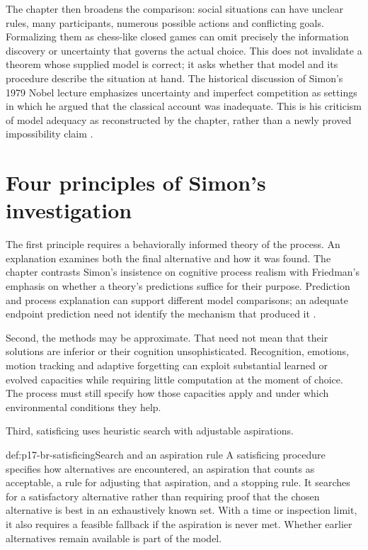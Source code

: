 The chapter then broadens the comparison: social situations can have
unclear rules, many participants, numerous possible actions and conflicting
goals. Formalizing them as chess-like closed games can omit precisely
the information discovery or uncertainty that governs the actual choice.
This does not invalidate a theorem whose supplied model is correct; it
asks whether that model and its procedure describe the situation at hand.
The historical discussion of Simon's 1979 Nobel lecture emphasizes
uncertainty and imperfect competition as settings in which he argued
that the classical account was inadequate. This is his criticism of
model adequacy as reconstructed by the chapter, rather than a newly
proved impossibility claim \cite[note~4, p.~513]{HertwigKozyreva2021Bounded}.

\section{Four principles of Simon's investigation}
\label{sec:p17-br-four-principles}

The first principle requires a behaviorally informed theory of the process.
An explanation examines both the final alternative and how it was found.
The chapter contrasts Simon's insistence on cognitive process realism
with Friedman's emphasis on whether a theory's predictions suffice for
their purpose. Prediction and process explanation can support different
model comparisons; an adequate endpoint prediction need not identify the
mechanism that produced it \cite[pp.~507--508]{HertwigKozyreva2021Bounded}.

Second, the methods may be approximate. That need not mean that their
solutions are inferior or their cognition unsophisticated. Recognition,
emotions, motion tracking and adaptive forgetting can exploit substantial
learned or evolved capacities while requiring little computation at the
moment of choice. The process must still specify how those capacities
apply and under which environmental conditions they help.

Third, satisficing uses heuristic search with adjustable aspirations.
\begin{hbdefinition}{def:p17-br-satisficing}{Search and an aspiration rule}
A satisficing procedure specifies how alternatives are encountered, an
aspiration that counts as acceptable, a rule for adjusting that aspiration,
and a stopping rule. It searches for a satisfactory alternative rather
than requiring proof that the chosen alternative is best in an exhaustively
known set. With a time or inspection limit, it also requires a feasible
fallback if the aspiration is never met. Whether earlier alternatives
remain available is part of the model.
\end{hbdefinition}

